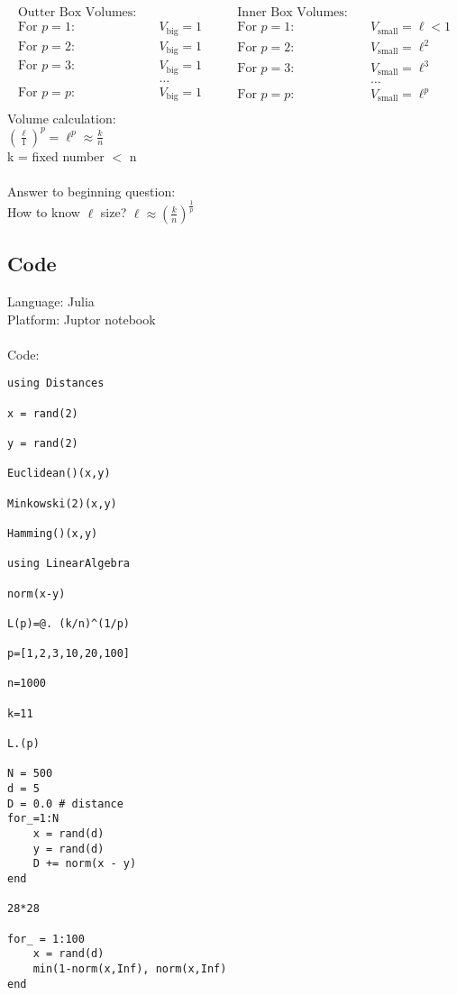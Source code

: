 \[
\begin{aligned}
\text{Outter Box Volumes:} \quad\\
\text{For } p=1: \quad & V_{\text{big}} = 1 \\
\text{For } p=2: \quad & V_{\text{big}} = 1 \\
\text{For } p=3: \quad & V_{\text{big}} = 1 \\
& \dots \\
\text{For } p=p: \quad & V_{\text{big}} = 1 \\
\end{aligned}
\quad \quad
\begin{aligned}
\text{Inner Box Volumes:} \quad\\
\text{For } p=1: \quad & V_{\text{small}} = \ell < 1 \\
\text{For } p=2: \quad & V_{\text{small}} = \ell^2 \\
\text{For } p=3: \quad & V_{\text{small}} = \ell^3 \\
& \dots \\
\text{For } p=p: \quad & V_{\text{small}} = \ell^p \\
\end{aligned}
\]
Volume calculation: \\
$(\frac{\ell}{1})^p = \ell^p \approx \frac{k}{n}$  \\
k = fixed number $<$ n \\\\
Answer to beginning question: \\
How to know $\ell$ size? $\ell \approx (\frac{k}{n})^\frac{1}{p}$\\

\subsection{Code}
Language: Julia\\
Platform: Juptor notebook\\\\
Code:\\
\begin{verbatim}
using Distances

x = rand(2) 

y = rand(2)

Euclidean()(x,y)

Minkowski(2)(x,y)

Hamming()(x,y)

using LinearAlgebra 

norm(x-y)

L(p)=@. (k/n)^(1/p)

p=[1,2,3,10,20,100]

n=1000

k=11

L.(p)

N = 500
d = 5
D = 0.0 # distance
for_=1:N
    x = rand(d)
    y = rand(d)
    D += norm(x - y)
end

28*28

for_ = 1:100
    x = rand(d)
    min(1-norm(x,Inf), norm(x,Inf)
end
\end{verbatim}

